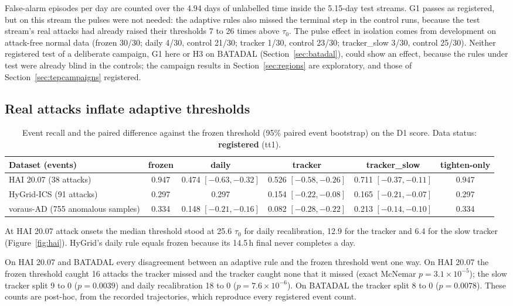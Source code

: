 \documentclass[letterpaper,twocolumn,10pt]{article}
\begin{document}
False-alarm episodes per day are counted over the 4.94 days of unlabelled time inside the 5.15-day
test streams. G1 passes as registered, but on this stream the pulses were not needed: the adaptive
rules also missed the terminal step in the control runs, because the test stream's real attacks had
already raised their thresholds 7 to 26 times above $\tau_0$. The pulse effect in isolation comes
from development on attack-free normal data (frozen 30/30; daily 4/30, control 21/30; tracker 1/30,
control 23/30; tracker\_slow 3/30, control 25/30). Neither registered test of a deliberate campaign, G1
here or H3 on BATADAL (Section~\ref{sec:batadal}), could show an effect, because the rules under test
were already blind in the controls; the campaign results in Section~\ref{sec:regions} are exploratory, and those of
Section~\ref{sec:tepcampaigns} registered.

\subsection{Real attacks inflate adaptive thresholds}
\label{sec:inflate}

\begin{table}[t]
\caption{Event recall and the paired difference against the frozen threshold (95\% paired event
bootstrap) on the D1 score. Data status: \textbf{registered} (tt1).}
\label{tab:recall}
\begin{tabularx}{\textwidth}{@{}Lccccc@{}}
\toprule
Dataset (events) & frozen & daily & tracker & tracker\_slow & tighten-only \\
\midrule
HAI 20.07 (38 attacks) & 0.947 & 0.474 $[-0.63, -0.32]$ & 0.526 $[-0.58, -0.26]$ & 0.711 $[-0.37, -0.11]$ & 0.947 \\
HyGrid-ICS (91 attacks) & 0.297 & 0.297 & 0.154 $[-0.22, -0.08]$ & 0.165 $[-0.21, -0.07]$ & 0.297 \\
voraus-AD (755 anomalous samples) & 0.334 & 0.148 $[-0.21, -0.16]$ & 0.082 $[-0.28, -0.22]$ & 0.213 $[-0.14, -0.10]$ & 0.334 \\
\bottomrule
\end{tabularx}
\end{table}

At HAI 20.07 attack onsets the median threshold stood at 25.6 $\tau_0$ for daily recalibration, 12.9
for the tracker and 6.4 for the slow tracker (Figure~\ref{fig:hai}). HyGrid's daily rule equals frozen because its 14.5\,h
final never completes a day.

On HAI 20.07 and BATADAL every disagreement between an adaptive rule and the frozen threshold went one way. On HAI 20.07 the
frozen threshold caught 16 attacks the tracker missed and the tracker caught none that it missed
(exact McNemar $p = 3.1 \times 10^{-5}$); the slow tracker split 9 to 0 ($p = 0.0039$) and daily
recalibration 18 to 0 ($p = 7.6 \times 10^{-6}$). On BATADAL the tracker split 8 to 0 ($p = 0.0078$).
These counts are post-hoc, from the recorded trajectories, which reproduce every registered event
count.
\end{document}
